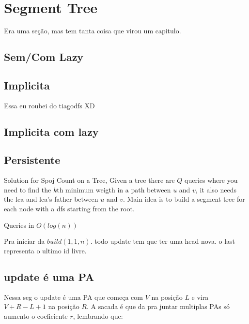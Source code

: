 \chapter{Segment Tree}
    \tab Era uma seção, mas tem tanta coisa que virou um capitulo.
    \section{Sem/Com Lazy}
    
   
    \section{Implicita}
    \tab Essa eu roubei do tiagodfs XD
    
    
    \section{Implicita com lazy}
    
    
    \section{Persistente}
    \tab Solution for Spoj Count on a Tree,
    Given a tree there are $Q$ queries where you need to find the $k$th minimum weigth in a path between $u$ and $v$, it also needs the lca and lca's father between $u$ and $v$.\newline
    Main idea is to build a segment tree for each node with a dfs starting from the root.
    
    Queries in $O(log(n))$

    Pra iniciar da $build(1,1,n)$.
    todo update tem que ter uma head nova. o last representa o ultimo id livre.
    
    
    \section{update é uma PA}
    \tab Nessa seg o update é uma PA que começa com $V$ na posição $L$ e vira $V + R-L+1$ na posição $R$.
    A sacada é que da pra juntar multiplas PAs só aumento o coeficiente $r$, lembrando que:
    
